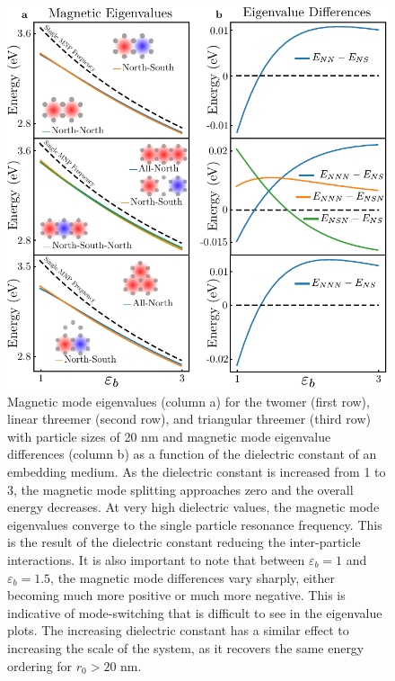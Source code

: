 \documentclass[journal=apchd5,manuscript=article]{achemso}
\begin{document}
\begin{figure}
\centering
\includegraphics[width=5in]{dielectric_study.pdf}
\caption{Magnetic mode eigenvalues (column a) for the twomer (first row), linear threemer (second row), and triangular threemer (third row) with particle sizes of 20 nm and magnetic mode eigenvalue differences (column b) as a function of the dielectric constant of an embedding medium. As the dielectric constant is increased from 1 to 3, the magnetic mode splitting approaches zero and the overall energy decreases. At very high dielectric values, the magnetic mode eigenvalues converge to the single particle resonance frequency. This is the result of the dielectric constant reducing the inter-particle interactions. It is also important to note that between $\varepsilon_b = 1$ and $\varepsilon_b = 1.5$, the magnetic mode differences vary sharply, either becoming much more positive or much more negative. This is indicative of mode-switching that is difficult to see in the eigenvalue plots. The increasing dielectric constant has a similar effect to increasing the scale of the system, as it recovers the same energy ordering for $r_0 > 20$ nm.}
\label{dielectric}
\end{figure}
\end{document}
